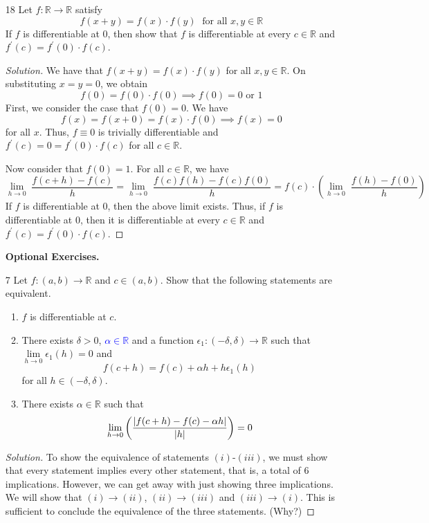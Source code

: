 \documentclass[12pt]{article}
\theoremstyle{definition}
\newenvironment{soln}{\begin{proof}[Solution]}{\end{proof}}
\begin{document}
\begin{enumerate}[leftmargin=*]
    \item[18] Let $f \colon \mathbb{R} \to \mathbb{R}$ satisfy
    \[
        f(x+y) = f(x) \cdot f(y)  \; \text{ for all } x,y \in \mathbb{R}
    \]
    If $f$ is differentiable at $0$, then show that $f$ is differentiable at every $c \in \mathbb{R}$ and $f^{\prime}(c) = f^{\prime}(0) \cdot f(c)$.
    \begin{soln}
        We have that $f(x+y) = f(x) \cdot f(y)$ for all $x,y \in \mathbb{R}$. On substituting $x=y=0$, we obtain 
        \[
            f(0) = f(0) \cdot f(0) \implies f(0) = 0 \text{ or } 1
        \]
        First, we consider the case that $f(0)=0$. We have
        \[
            f(x) = f(x+0) = f(x) \cdot f(0) \implies f(x) = 0
        \]
        for all $x$. Thus, $f \equiv 0$ is trivially differentiable and $f^{\prime}(c) = 0 = f^{\prime}(0) \cdot f(c)$ for all $c \in \mathbb{R}$. 
        \medskip
        
        Now consider that $f(0) = 1$. For all $c \in \mathbb{R}$, we have
        \[
            \lim_{h \to 0} \; \frac{f(c+h) - f(c)}{h} = \lim_{h \to 0} \; \frac{f(c)f(h) - f(c) f(0)}{h} = f(c) \cdot \left( \lim_{h \to 0} \; \frac{f(h) - f(0)}{h} \right)
        \]
        If $f$ is differentiable at $0$, then the above limit exists. Thus, if $f$ is differentiable at $0$, then it is differentiable at every $c \in \mathbb{R}$ and $f^{\prime}(c) = f^{\prime}(0) \cdot f(c)$.
    \end{soln}
    
    \newpage
    
    \textbf{Optional Exercises.}
    
    \item[7] Let $f \colon (a,b) \to \mathbb{R}$ and $c \in (a,b)$. Show that the following statements are equivalent. 
    \begin{enumerate}[label = (\roman*)]
        \item $f$ is differentiable at $c$.
        \item There exists $\delta>0$, \textcolor{blue}{$\alpha \in \mathbb{R}$} and a function $\epsilon_1 \colon (-\delta, \delta) \to \mathbb{R}$ such that $\lim\limits_{h \to 0} \epsilon_1(h) = 0$ and
        \[
            f(c+h) = f(c) + \alpha h + h \epsilon_1(h)
        \]
        for all $h \in (-\delta, \delta)$.
        \item There exists $\alpha \in \mathbb{R}$ such that
        \[
            \lim_{h \to 0} \left( \frac{\abs{f(c+h) - f(c) - \alpha h}}{\abs{h}} \right) = 0
        \]
    \end{enumerate}
    \begin{soln}
        To show the equivalence of statements $(i)$-$(iii)$, we must show that every statement implies every other statement, that is, a total of $6$ implications. However, we can get away with just showing three implications. We will show that $(i) \to (ii)$, $(ii) \to (iii)$ and $(iii) \to (i)$. This is sufficient to conclude the equivalence of the three statements. (Why?)
        \medskip
        

\end{soln}
\end{enumerate}
\end{document}
